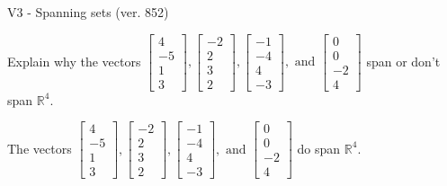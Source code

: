 \begin{exercise}
  \begin{exerciseTitle}V3 - Spanning sets (ver. 852)\end{exerciseTitle}
  \begin{exerciseStatement}
    Explain why the vectors \(\left[\begin{array}{r}
4 \\
-5 \\
1 \\
3
\end{array}\right] , \left[\begin{array}{r}
-2 \\
2 \\
3 \\
2
\end{array}\right] , \left[\begin{array}{r}
-1 \\
-4 \\
4 \\
-3
\end{array}\right] , \text{ and } \left[\begin{array}{r}
0 \\
0 \\
-2 \\
4
\end{array}\right]\) span or don't span \(\mathbb{R}^4\). 
	


  \end{exerciseStatement}
  \begin{exerciseAnswer}
   The vectors \(\left[\begin{array}{r}
4 \\
-5 \\
1 \\
3
\end{array}\right] , \left[\begin{array}{r}
-2 \\
2 \\
3 \\
2
\end{array}\right] , \left[\begin{array}{r}
-1 \\
-4 \\
4 \\
-3
\end{array}\right] , \text{ and } \left[\begin{array}{r}
0 \\
0 \\
-2 \\
4
\end{array}\right]\) 
  	 do  
	span \(\mathbb{R}^4\).
  


  \end{exerciseAnswer}
\end{exercise}